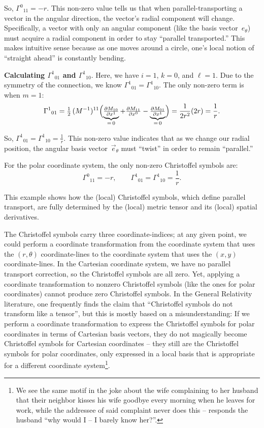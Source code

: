\documentclass[twocolumn]{article}
\begin{document}
So, $\Gamma^0{}_{11} = -r$.  This non-zero value tells us that when
parallel-transporting a vector in the angular direction, the vector's
radial component will change.  Specifically, a vector with only an
angular component (like the basis vector~$e_\theta$) must acquire a
radial component in order to stay ``parallel transported.''  This makes
intuitive sense because as one moves around a circle, one's local notion
of ``straight ahead'' is constantly bending.

{\bf Calculating $\Gamma^1{}_{01}$ and $\Gamma^1{}_{10}$}.
Here, we have $i=1$, $k=0$, and $\ell=1$.  Due to the symmetry of the
connection, we know $\Gamma^1{}_{01} = \Gamma^1{}_{10}$.  The only non-zero
term is when $m=1$:
\begin{equation}
  \Gamma^1{}_{01}
    = \tfrac{1}{2}\,(M^{-1})^{11}
      \Bigl(
        \underbrace{\tfrac{\partial M_{10}}{\partial x^1}}_{=\,0}
        + \tfrac{\partial M_{11}}{\partial x^0}
        - \underbrace{\tfrac{\partial M_{01}}{\partial x^1}}_{=\,0}
      \Bigr)
    = \frac{1}{2r^2}(2r)
    = \frac{1}{r}.
\end{equation}

So, $\Gamma^1{}_{01} = \Gamma^1{}_{10} = \frac{1}{r}$.  This non-zero
value indicates that as we change our radial position, the angular basis
vector~$\vec{e}_\theta$ must ``twist'' in order to remain ``parallel.''

For the polar coordinate system, the only non-zero Christoffel symbols
are:
\begin{equation}
  \Gamma^0{}_{11} = -r,
  \qquad
  \Gamma^1{}_{01} = \Gamma^1{}_{10} = \frac{1}{r}.
\end{equation}
  
This example shows how the (local) Christoffel symbols, which define
parallel transport, are fully determined by the (local) metric tensor
and its (local) spatial derivatives.

The Christoffel symbols carry three coordinate-indices; at any given
point, we could perform a coordinate transformation from the
coordinate system that uses the $(r, \theta)$ coordinate-lines to the
coordinate system that uses the $(x, y)$ coordinate-lines. In the
Cartesian coordinate system, we have no parallel transport correction,
so the Christoffel symbols are all zero. Yet, applying a coordinate
transformation to nonzero Christoffel symbols (like the ones for polar
coordinates) cannot produce zero Christoffel symbols. In the General
Relativity literature, one frequently finds the claim that
``Christoffel symbols do not transform like a tensor'', but this is
mostly based on a misunderstanding: If we perform a coordinate
transformation to express the Christoffel symbols for polar
coordinates in terms of Cartesian basis vectors, they do not magically
become Christoffel symbols for Cartesian coordinates -- they still are
the Christoffel symbols for polar coordinates, only expressed in
a local basis that is appropriate for a different coordinate system\footnote{
We see the same motif in the joke about the wife complaining to her husband
that their neighbor kisses his wife goodbye every morning when he leaves
for work, while the addressee of said complaint never does this -- responds
the husband ``why would I -- I barely know her?''.}.
\end{document}
